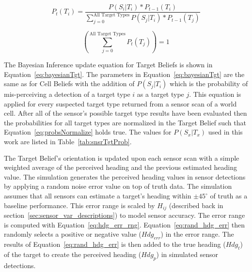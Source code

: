 



\begin{equation}
\label{eq:bayesianTgt}
P_{t}(T_{i}) = \frac{P(S_{i}|T_{i})*P_{t-1}(T_{i})}{ \sum_{j=0}^{\text{All Target Types}}P(S_{j}|T_{i}) * P_{t-1}(T_{j}) }
\end{equation}

\begin{equation}
\label{eq:probsNormalize}
\left( \sum_{j=0}^{\text{All Target Types}}P_{t}(T_{j})\right)  = 1
\end{equation}


The Bayesian Inference update equation for Target Beliefs is shown in Equation~\ref{eq:bayesianTgt}.  The parameters in Equation~\ref{eq:bayesianTgt} are the same as for Cell Beliefs with the addition of $P(S_{j}|T_{i})$ which is the probability of mis-perceiving a detection of a target type $i$ as a target type $j$.  This equation is applied for every suspected target type returned from a sensor scan of a world cell. After all of the sensor's possible target type results have been evaluated then the probabilities for all target types are normalized in the Target Belief such that Equation~\ref{eq:probsNormalize} holds true.  The values for $P(S_{x}|T_{x})$ used in this work are listed in Table~\ref{tab:snsrTgtProb}.



The Target Belief's orientation is updated upon each sensor scan with a simple weighted average of the perceived heading and the previous estimated heading value.  The simulation generates the perceived heading values in sensor detections by applying a random noise error value on top of truth data.  The simulation assumes that all sensors can estimate a target's heading within $\pm45^{\circ}$ of truth as a baseline performance.  This error range is scaled by $H_{ij}$ (described back in section~\ref{sec:sensor_var_descriptions}) to model sensor accuracy. The error range is computed with Equation~\ref{eq:hdg_err_rng}.  Equation~\ref{eq:rand_hdg_err} then randomly selects a positive or negative value ($Hdg_{err}$) in the error range.  The results of Equation~\ref{eq:rand_hdg_err} is then added to the true heading ($Hdg_{t}$) of the target to create the perceived heading ($Hdg_{p}$) in simulated sensor detections.

